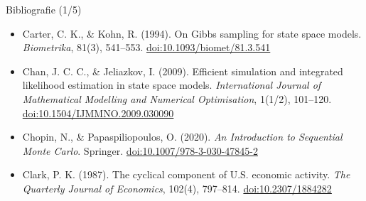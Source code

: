\begin{frame}{Bibliografie (1/5)}
\begin{itemize}
    \item Carter, C. K., \& Kohn, R. (1994). On Gibbs sampling for state space models. \textit{Biometrika}, 81(3), 541--553. \href{https://doi.org/10.1093/biomet/81.3.541}{doi:10.1093/biomet/81.3.541}
    \item Chan, J. C. C., \& Jeliazkov, I. (2009). Efficient simulation and integrated likelihood estimation in state space models. \textit{International Journal of Mathematical Modelling and Numerical Optimisation}, 1(1/2), 101--120. \href{https://doi.org/10.1504/IJMMNO.2009.030090}{doi:10.1504/IJMMNO.2009.030090}
    \item Chopin, N., \& Papaspiliopoulos, O. (2020). \textit{An Introduction to Sequential Monte Carlo}. Springer. \href{https://doi.org/10.1007/978-3-030-47845-2}{doi:10.1007/978-3-030-47845-2}
    \item Clark, P. K. (1987). The cyclical component of U.S. economic activity. \textit{The Quarterly Journal of Economics}, 102(4), 797--814. \href{https://doi.org/10.2307/1884282}{doi:10.2307/1884282}
\end{itemize}
\end{frame}

